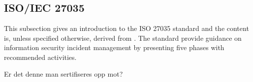 \subsection{\acs{ISO}/\acs{IEC} 27035}
This subsection gives an introduction to the ISO 27035 standard and the content is, unless specified otherwise, derived from \cite{ISO/IEC27035}. The standard provide guidance on information security incident management by presenting five phases with recommended activities. 

Er det denne man sertifiseres opp mot? 